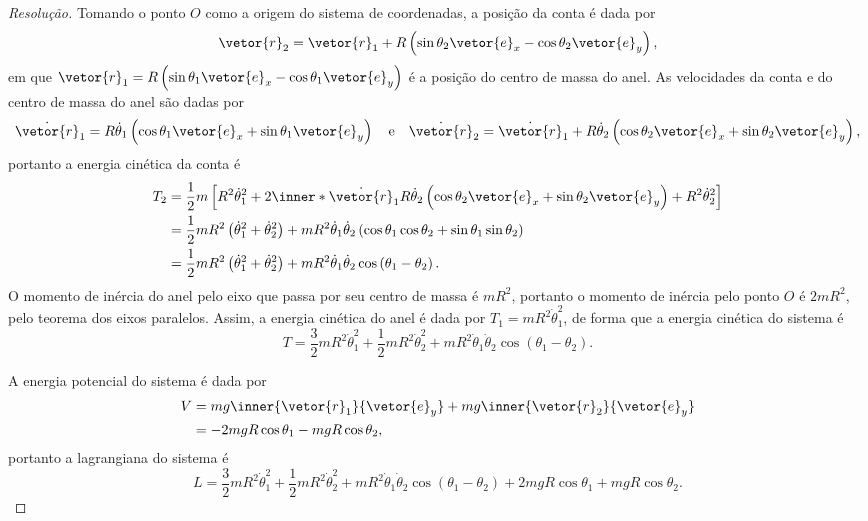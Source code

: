 \begin{proof}[Resolução]
    Tomando o ponto \(O\) como a origem do sistema de coordenadas, a posição da conta é dada por
    \begin{equation*}
        \vetor{r}_2 = \vetor{r}_1 + R\left(\sin\theta_2\vetor{e}_x - \cos\theta_2 \vetor{e}_y\right),
    \end{equation*}
    em que \(\vetor{r}_1 = R\left(\sin\theta_1\vetor{e}_x - \cos\theta_1\vetor{e}_y\right)\) é a posição do centro de massa do anel. As velocidades da conta e do centro de massa do anel são dadas por
    \begin{equation*}
        \dot{\vetor{r}}_1 = R\dot\theta_1\left(\cos\theta_1\vetor{e}_x + \sin\theta_1\vetor{e}_y\right)\quad\text{e}\quad\dot{\vetor{r}}_2 = \dot{\vetor{r}}_1 + R\dot\theta_2\left(\cos\theta_2\vetor{e}_x + \sin\theta_2\vetor{e}_y\right),
    \end{equation*}
    portanto a energia cinética da conta é
    \begin{align*}
        T_2 &= \frac12 m \left[R^2\dot\theta_1^2 + 2\inner*{\dot{\vetor{r}}_1}{R\dot\theta_2\left(\cos\theta_2\vetor{e}_x + \sin\theta_2\vetor{e}_y\right)} + R^2\dot\theta_2^2\right]\\
        &= \frac12 m R^2\left(\dot\theta_1^2 + \dot\theta_2^2\right) + mR^2\dot\theta_1\dot\theta_2 \left(\cos\theta_1\cos\theta_2 + \sin\theta_1 \sin\theta_2\right)\\
        &= \frac12 m R^2\left(\dot\theta_1^2 + \dot\theta_2^2\right) + mR^2\dot\theta_1\dot\theta_2 \cos\left(\theta_1-\theta_2\right).
    \end{align*}
    O momento de inércia do anel pelo eixo que passa por seu centro de massa é \(mR^2\), portanto o momento de inércia pelo ponto \(O\) é \(2mR^2\), pelo teorema dos eixos paralelos. Assim, a energia cinética do anel é dada por \(T_1 = mR^2\dot\theta_1^2\), de forma que a energia cinética do sistema é
    \begin{equation*}
        T = \frac32 m R^2\dot\theta_1^2 + \frac12 m R^2\dot\theta_2^2+ mR^2\dot\theta_1\dot\theta_2 \cos\left(\theta_1-\theta_2\right).
    \end{equation*}

    A energia potencial do sistema é dada por
    \begin{align*}
        V &= mg \inner{\vetor{r}_1}{\vetor{e}_y} + mg\inner{\vetor{r}_2}{\vetor{e}_y}\\
          &= -2 mgR \cos\theta_1 - mgR \cos\theta_2,
    \end{align*}
    portanto a lagrangiana do sistema é
    \begin{equation*}
        L = \frac32 mR^2\dot\theta_1^2 + \frac12 mR^2\dot\theta_2^2 + m R^2\dot\theta_1\dot\theta_2\cos{(\theta_1 - \theta_2)} + 2mgR \cos\theta_1 + mgR\cos\theta_2.
    \end{equation*}


\end{proof}
